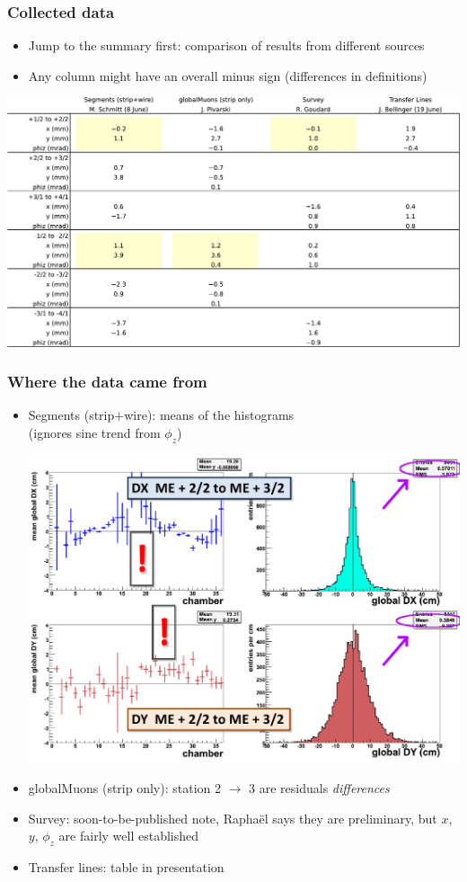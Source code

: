 \documentclass[compress]{beamer}
\begin{document}
\begin{frame}
\frametitle{Collected data}

\begin{minipage}{1.2\linewidth}
\begin{itemize}
\item Jump to the summary first: comparison of results from different sources
\item Any column might have an overall minus sign (differences in definitions)
\end{itemize}
\end{minipage}

\vfill
\includegraphics[width=\linewidth]{table.pdf}
\end{frame}

\begin{frame}
\frametitle{Where the data came from}

\begin{itemize}\setlength{\itemsep}{0.25 cm}
\item Segments (strip$+$wire): means of the histograms \\ (ignores sine trend from $\phi_z$)

\includegraphics[width=0.65\linewidth]{global_residuals.png}

\item globalMuons (strip only): station 2 $\to$ 3 are residuals {\it differences}

\item Survey: soon-to-be-published note, Rapha\"el says they are preliminary, but $x$, $y$, $\phi_z$ are fairly well established

\item Transfer lines: table in presentation
\end{itemize}
\end{frame}
\end{document}

